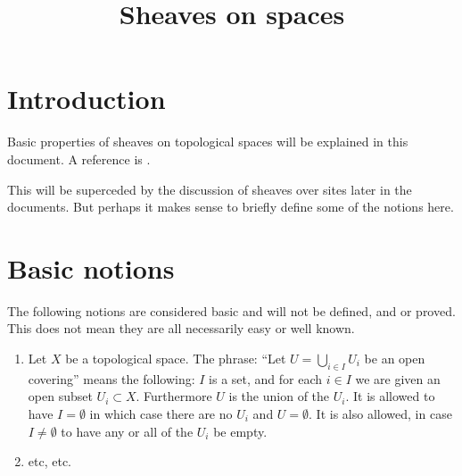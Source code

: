 

%


\title{Sheaves on spaces}


\maketitle

\tableofcontents

\section{Introduction}
\label{section-introduction}

\noindent
Basic properties of sheaves on topological spaces
will be explained in this document.
A reference is \cite{Godement}.

\medskip\noindent
This will be superceded by the discussion of sheaves
over sites later in the documents. But perhaps it makes
sense to briefly define some of the notions here.











\section{Basic notions}
\label{section-sheaves-basic}

\noindent
The following notions are considered basic and will not be defined,
and or proved. This does not mean they are all necessarily easy or
well known.

\begin{enumerate}
\item Let $X$ be a topological space. The phrase: ``Let
$U = \bigcup_{i \in I} U_i$ be an open covering'' means the
following: $I$ is a set, and for each $i \in I$ we are given
an open subset $U_i \subset X$. Furthermore $U$ is the
union of the $U_i$. It is allowed to have $I = \emptyset$
in which case there are no $U_i$ and $U = \emptyset$.
It is also allowed, in case $I \not= \emptyset$ to have
any or all of the $U_i$ be empty.
\item etc, etc.
\end{enumerate}












